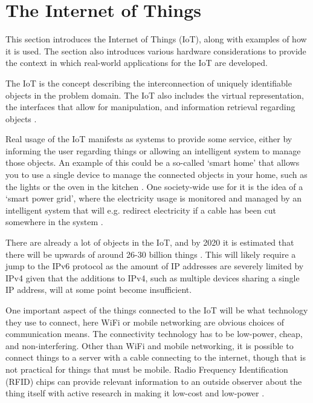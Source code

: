 \section{The Internet of Things}
This section introduces the Internet of Things (IoT), along with examples of how it is used. 
The section also introduces various hardware considerations to provide the context in which real-world applications for the IoT are developed.

The IoT is the concept describing the interconnection of uniquely identifiable objects in the problem domain.
The IoT also includes the virtual representation, the interfaces that allow for manipulation, and information retrieval regarding objects \citep{misc:InternetOfThingsDefinition, misc:InternetOfThingsDefinition2, misc:InternetOfThingsDefinition3}.

Real usage of the IoT manifests as systems to provide some service, either by informing the user regarding things or allowing an intelligent system to manage those objects.
An example of this could be a so-called `smart home' that allows you to use a single device to manage the connected objects in your home, such as the lights or the oven in the kitchen \citep{misc:InternetOfThingsExamples}.
One society-wide use for it is the idea of a `smart power grid', where the electricity usage is monitored and managed by an intelligent system that will e.g. redirect electricity if a cable has been cut somewhere in the system \citep{misc:smartGrid}.

There are already a lot of objects in the IoT, and by 2020 it is estimated that there will be upwards of around 26-30 billion things \citep{misc:IoTGrowth1,misc:IoTGrowth2}.
This will likely require a jump to the IPv6 protocol as the amount of IP addresses are severely limited by IPv4 \citep{misc:numberOfAddresses} given that the additions to IPv4, such as multiple devices sharing a single IP address, will at some point become insufficient.

One important aspect of the things connected to the IoT will be what technology they use to connect, here WiFi or mobile networking are obvious choices of communication means.
The connectivity technology has to be low-power, cheap, and non-interfering.
Other than WiFi and mobile networking, it is possible to connect things to a server with a cable connecting to the internet, though that is not practical for things that must be mobile.
Radio Frequency Identification (RFID) chips can provide relevant information to an outside observer about the thing itself \citep{misc:rfid} with active research in making it low-cost and low-power \citep{misc:rfid2}.


